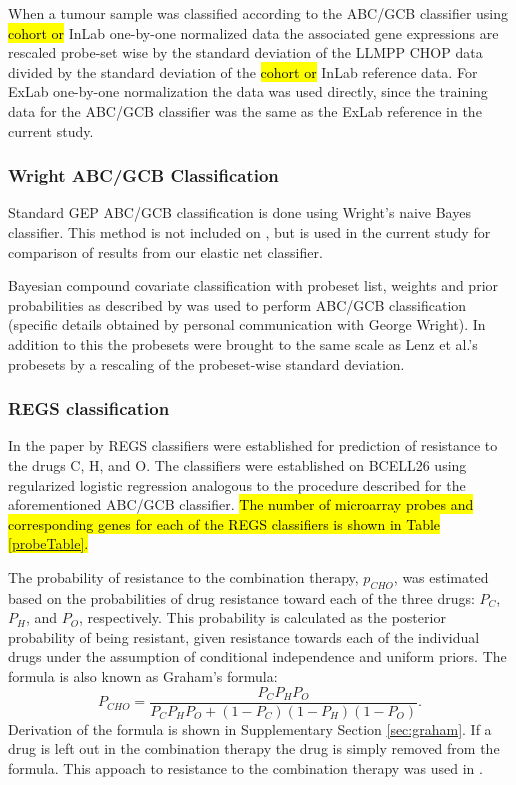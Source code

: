 \documentclass{article}
\begin{document}
When a tumour sample was classified according to the ABC/GCB classifier using \hl{cohort or} InLab one-by-one normalized data the associated gene expressions are rescaled probe-set wise by the standard deviation of the LLMPP CHOP data divided by the standard deviation of the \hl{cohort or} InLab reference data. For ExLab one-by-one normalization the data was used directly, since the training data for the ABC/GCB classifier was the same as the ExLab reference in the current study.

\subsubsection{Wright ABC/GCB Classification}
Standard GEP ABC/GCB classification is done using Wright's naive Bayes classifier. This method is not included on \hemaClass{}, but is used in the current study for comparison of results from our elastic net classifier.

Bayesian compound covariate classification \citep{Wright2003} with probeset list, weights and prior probabilities as described by \citet{Lenz2008a} was used to perform ABC/GCB classification (specific details obtained by personal communication with George Wright). In addition to this the probesets were brought to the same scale as Lenz et al.'s \citep{Lenz2008a} probesets by a rescaling of the probeset-wise standard deviation.


\subsubsection{REGS classification}
\label{sec:regsmethods}
In the paper by \citet{Falgreen2015} REGS classifiers were established for prediction of resistance to the drugs C, H, and O.
The classifiers were established on BCELL26 using regularized logistic regression analogous to the procedure described for the aforementioned ABC/GCB classifier. \hl{The number of microarray probes and corresponding genes for each of the REGS classifiers is shown in Table \mbox{\ref{probeTable}}.}

The probability of resistance to the combination therapy, $p_{CHO}$, was estimated based on the probabilities of drug resistance toward each of the three drugs: $P_C$, $P_H$, and $P_O$, respectively.
This probability is calculated as the posterior probability of being resistant, given resistance towards each of the individual drugs under the assumption of conditional independence and uniform priors.
The formula is also known as Graham's formula:
\begin{equation*}
  P_{CHO} = \frac{P_C P_H P_O}{P_C P_H P_O + (1 - P_C)(1 - P_H)(1 - P_O)}.
\end{equation*}
Derivation of the formula is shown in Supplementary Section \ref{sec:graham}.
If a drug is left out in the combination therapy the drug is simply removed from the formula.
This appoach to resistance to the combination therapy was used in \citet{Falgreen2015}.
\end{document}

